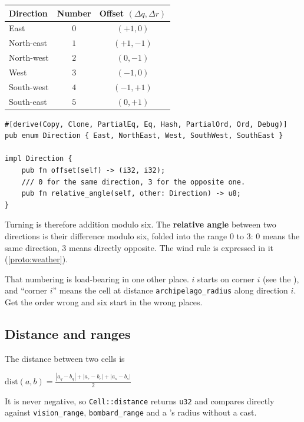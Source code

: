 \documentclass{article}
\begin{document}
\begin{center}
\begin{tabular}{|l|c|c|}
 \hline
 {\bf Direction} & {\bf Number} & {\bf Offset $(\Delta q, \Delta r)$} \\
 \hline\hline
 East & $0$ & $(+1, 0)$ \\
 \hline
 North-east & $1$ & $(+1, -1)$ \\
 \hline
 North-west & $2$ & $(0, -1)$ \\
 \hline
 West & $3$ & $(-1, 0)$ \\
 \hline
 South-west & $4$ & $(-1, +1)$ \\
 \hline
 South-east & $5$ & $(0, +1)$ \\
 \hline
\end{tabular}
\end{center}

\begin{lstlisting}
#[derive(Copy, Clone, PartialEq, Eq, Hash, PartialOrd, Ord, Debug)]
pub enum Direction { East, NorthEast, West, SouthWest, SouthEast }

impl Direction {
    pub fn offset(self) -> (i32, i32);
    /// 0 for the same direction, 3 for the opposite one.
    pub fn relative_angle(self, other: Direction) -> u8;
}
\end{lstlisting}

Turning is therefore addition modulo six. The \textbf{relative angle} between two directions is
their difference modulo six, folded into the range $0$ to $3$: $0$ means the same direction, $3$
means directly opposite. The wind rule is expressed in it (\cref{proto:weather}).

That numbering is load-bearing in one other place. \ship{} $i$ starts on corner $i$ (see the
\MD), and ``corner $i$'' means the cell at distance \texttt{archipelago\_radius} along direction
$i$. Get the order wrong and six \ships{} start in the wrong places.

\subsection{Distance and ranges}

The distance between two cells is

\begin{center}
$\mathrm{dist}(a,b) = \frac{|a_q - b_q| + |a_r - b_r| + |a_s - b_s|}{2}$
\end{center}

It is never negative, so \texttt{Cell::distance} returns \texttt{u32} and compares directly
against \texttt{vision\_range}, \texttt{bombard\_range} and a \clue's radius without a cast.
\end{document}
